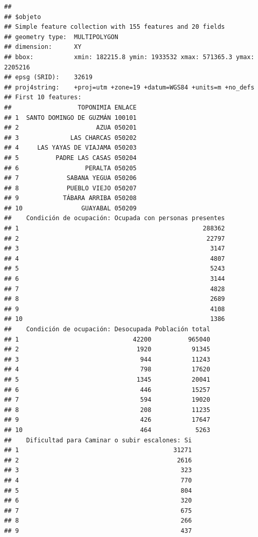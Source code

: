 \documentclass[11pt,]{article}
\begin{document}
\begin{verbatim}
## 
## $objeto
## Simple feature collection with 155 features and 20 fields
## geometry type:  MULTIPOLYGON
## dimension:      XY
## bbox:           xmin: 182215.8 ymin: 1933532 xmax: 571365.3 ymax: 2205216
## epsg (SRID):    32619
## proj4string:    +proj=utm +zone=19 +datum=WGS84 +units=m +no_defs
## First 10 features:
##                  TOPONIMIA ENLACE
## 1  SANTO DOMINGO DE GUZMÁN 100101
## 2                     AZUA 050201
## 3              LAS CHARCAS 050202
## 4     LAS YAYAS DE VIAJAMA 050203
## 5          PADRE LAS CASAS 050204
## 6                  PERALTA 050205
## 7             SABANA YEGUA 050206
## 8             PUEBLO VIEJO 050207
## 9            TÁBARA ARRIBA 050208
## 10                GUAYABAL 050209
##    Condición de ocupación: Ocupada con personas presentes
## 1                                                  288362
## 2                                                   22797
## 3                                                    3147
## 4                                                    4807
## 5                                                    5243
## 6                                                    3144
## 7                                                    4828
## 8                                                    2689
## 9                                                    4108
## 10                                                   1386
##    Condición de ocupación: Desocupada Población total
## 1                               42200          965040
## 2                                1920           91345
## 3                                 944           11243
## 4                                 798           17620
## 5                                1345           20041
## 6                                 446           15257
## 7                                 594           19020
## 8                                 208           11235
## 9                                 426           17647
## 10                                464            5263
##    Dificultad para Caminar o subir escalones: Si
## 1                                          31271
## 2                                           2616
## 3                                            323
## 4                                            770
## 5                                            804
## 6                                            320
## 7                                            675
## 8                                            266
## 9                                            437

\end{verbatim}
\end{document}
